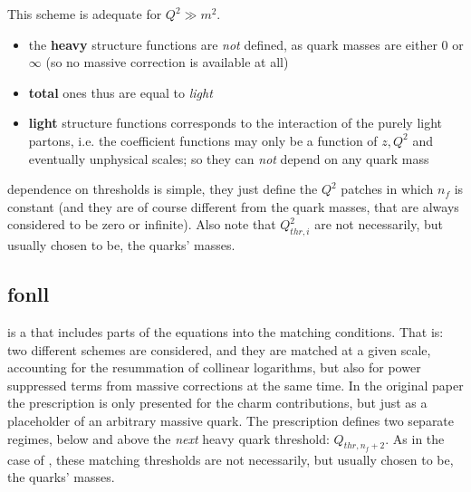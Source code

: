 This scheme is adequate for $Q^2\gg m^2$.

\begin{itemize}
\item the \textbf{heavy} structure functions are \textit{not} defined, as quark
  masses are either $0$ or $\infty$ (so no massive correction is available at
  all)
\item \textbf{total} ones thus are equal to \textit{light}
\item \textbf{light} structure functions corresponds to the interaction of the
  purely light partons, i.e. the coefficient functions may only be a function
  of $z,Q^2$ and eventually unphysical scales; so they can \textit{not} depend
  on any quark mass
\end{itemize}

\zmvfns dependence on thresholds is simple, they just define the $Q^2$
patches in which $n_f$ is constant (and they are of course different from
the quark masses, that are always considered to be zero or infinite).
Also note that $Q_{thr,i}^2$ are not necessarily, but usually chosen to be, the
quarks' masses.

\subsection[FONLL]{\acrfull{fonll}}
\label{sec:dis/fonll}

\fonll \cite{Forte:2010ta} is a \gmvfns that includes parts of the \dglap
equations into the matching conditions.
That is: two different schemes are considered, and they are matched at a given
scale, accounting for the resummation of collinear logarithms, but also for
power suppressed terms from massive corrections at the same time.
%
In the original paper the prescription is only presented for the charm
contributions, but just as a placeholder of an arbitrary massive quark.
%
The prescription defines two separate regimes, below and above the
\textit{next} heavy quark threshold: $Q_{thr,n_f+2}$.
%
As in the case of \zmvfns, these matching thresholds are not necessarily, but
usually chosen to be, the quarks' masses.

